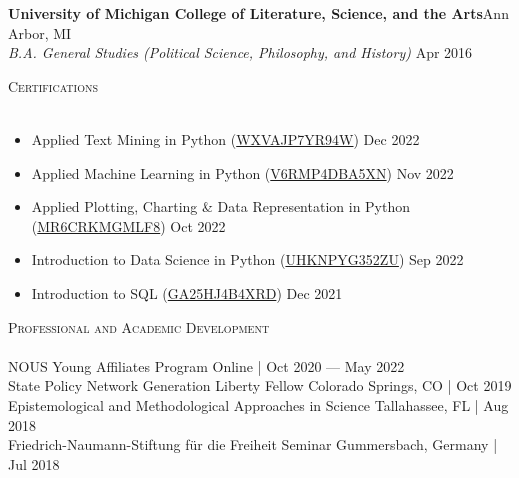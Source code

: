 \documentclass[a4paper,11pt]{article}
\newcommand{\lineunder} {
    \vspace*{-8pt} \\
    \hspace*{-18pt} \hrulefill \\
}
\newcommand{\header} [1] {
    {\hspace*{-18pt}\vspace*{6pt} \textsc{\large{#1}}}
    \vspace*{-6pt} \lineunder
}
\begin{document}
\textbf{University of Michigan College of Literature, Science, and the Arts}\hfill \faMapMarker\space Ann Arbor, MI\\
\textit{B.A. General Studies (Political Science, Philosophy, and History)} \hfill \faCalendar\space Apr 2016\\

\vspace{1mm}
\header{Certifications}
\begin{itemize}
    \item Applied Text Mining in Python (\href{https://www.coursera.org/account/accomplishments/verify/WXVAJP7YR94W}{WXVAJP7YR94W}) \hfill \faCalendar\space Dec 2022
    \item Applied Machine Learning in Python (\href{https://www.coursera.org/account/accomplishments/verify/V6RMP4DBA5XN}{V6RMP4DBA5XN}) \hfill \faCalendar\space Nov 2022
    \item Applied Plotting, Charting \& Data Representation in Python (\href{https://www.coursera.org/account/accomplishments/verify/MR6CRKMGMLF8}{MR6CRKMGMLF8}) \hfill \faCalendar\space Oct 2022
    \item Introduction to Data Science in Python (\href{https://www.coursera.org/account/accomplishments/verify/UHKNPYG352ZU}{UHKNPYG352ZU}) \hfill \faCalendar\space Sep 2022
    \item Introduction to SQL (\href{https://www.coursera.org/account/accomplishments/verify/GA25HJ4B4XRD}{GA25HJ4B4XRD}) \hfill \faCalendar\space Dec 2021
\end{itemize}
\vspace{1mm}
\header{Professional and Academic Development}

NOUS Young Affiliates Program \hfill \faMapMarker\space Online | \faCalendar\space Oct 2020 --- May 2022 \\

State Policy Network Generation Liberty Fellow \hfill \faMapMarker\space Colorado Springs, CO | \faCalendar\space Oct 2019 \\

Epistemological and Methodological Approaches in Science \hfill \faMapMarker\space Tallahassee, FL | \faCalendar\space Aug 2018\\

Friedrich-Naumann-Stiftung f\"{u}r die Freiheit Seminar \hfill \faMapMarker\space Gummersbach, Germany | \faCalendar\space Jul 2018 \\
\end{document}
